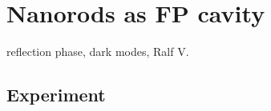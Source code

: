 \renewcommand{\lastmod}{September 24, 2021}
\renewcommand{\chapterauthors}{Markus Lippitz}


\chapter{Nanorods as FP cavity}



reflection phase, dark modes, Ralf V.



\section{Experiment}






\printbibliography[segment=\therefsegment,heading=subbibliography]
